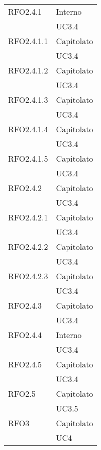 \begin{center}
\begin{longtable}{ | >{\centering\arraybackslash}m{5cm} | >{\centering\arraybackslash}m{5cm} | }
        RFO2.4.1 & Interno\\
            & UC3.4 \\
\hline

        RFO2.4.1.1 & Capitolato\\
            & UC3.4 \\
\hline

        RFO2.4.1.2 & Capitolato\\
            & UC3.4 \\
\hline

        RFO2.4.1.3 & Capitolato\\
            & UC3.4 \\
\hline

        RFO2.4.1.4 & Capitolato\\
            & UC3.4 \\
\hline

        RFO2.4.1.5 & Capitolato\\
            & UC3.4 \\
\hline

        RFO2.4.2 & Capitolato\\
            & UC3.4 \\
\hline

        RFO2.4.2.1 & Capitolato\\
            & UC3.4 \\
\hline

        RFO2.4.2.2 & Capitolato\\
            & UC3.4 \\
\hline

        RFO2.4.2.3 & Capitolato\\
            & UC3.4 \\
\hline

        RFO2.4.3 & Capitolato\\
            & UC3.4 \\
\hline

        RFO2.4.4 & Interno\\
            & UC3.4 \\
\hline

        RFO2.4.5 & Capitolato\\
            & UC3.4 \\
\hline

        RFO2.5 & Capitolato\\
            & UC3.5 \\
\hline

        RFO3 & Capitolato\\
            & UC4 \\
\hline


\end{longtable}
\end{center}
